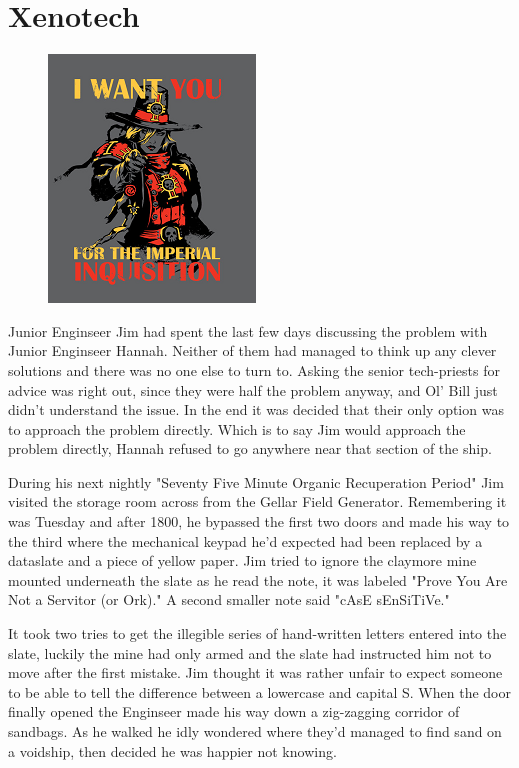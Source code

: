 \chapter{Xenotech}

\begin{figure}
	\begin{center}
		\includegraphics[width=\figwidth]{pics/11/1.png}
	\end{center}
\end{figure}
Junior Enginseer Jim had spent the last few days discussing the problem with Junior Enginseer Hannah. 
Neither of them had managed to think up any clever solutions and there was no one else to turn to. 
Asking the senior tech-priests for advice was right out, since they were half the problem anyway, and Ol' Bill just didn't understand the issue. 
In the end it was decided that their only option was to approach the problem directly. 
Which is to say Jim would approach the problem directly, Hannah refused to go anywhere near that section of the ship.

During his next nightly "Seventy Five Minute Organic Recuperation Period" Jim visited the storage room across from the Gellar Field Generator. 
Remembering it was Tuesday and after 1800, he bypassed the first two doors and made his way to the third where the mechanical keypad he'd expected had been replaced by a dataslate and a piece of yellow paper. 
Jim tried to ignore the claymore mine mounted underneath the slate as he read the note, it was labeled "Prove You Are Not a Servitor (or Ork)." A second smaller note said "cAsE sEnSiTiVe."

It took two tries to get the illegible series of hand-written letters entered into the slate, luckily the mine had only armed and the slate had instructed him not to move after the first mistake. 
Jim thought it was rather unfair to expect someone to be able to tell the difference between a lowercase and capital S. 
When the door finally opened the Enginseer made his way down a zig-zagging corridor of sandbags. 
As he walked he idly wondered where they'd managed to find sand on a voidship, then decided he was happier not knowing. 


